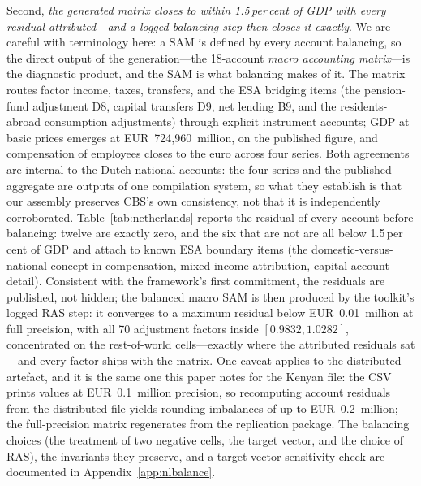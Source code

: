 Second, \emph{the generated matrix closes to within 1.5\,per\,cent of
GDP with every residual attributed---and a logged balancing step then
closes it exactly}. We are careful with terminology here: a SAM is
defined by every account balancing, so the direct output of the
generation---the 18-account \emph{macro accounting matrix}---is the
diagnostic product, and the SAM is what balancing makes of it. The matrix
routes factor income, taxes, transfers, and the ESA bridging items (the
pension-fund adjustment D8, capital transfers D9, net lending B9, and the
residents-abroad consumption adjustments) through explicit instrument
accounts; GDP at basic prices emerges at EUR~724{,}960~million, on the
published figure, and compensation of employees closes to the euro across
four series. Both agreements are internal to the Dutch national accounts:
the four series and the published aggregate are outputs of one compilation
system, so what they establish is that our assembly preserves CBS's own
consistency, not that it is independently corroborated. Table~\ref{tab:netherlands} reports the residual
of every account before balancing: twelve are exactly zero, and the six
that are not are all below 1.5\,per\,cent of GDP and attach to known ESA
boundary items (the domestic-versus-national concept in compensation,
mixed-income attribution, capital-account detail). Consistent with the
framework's first commitment, the residuals are published, not hidden;
the balanced macro SAM is then produced by the toolkit's logged RAS
step: it converges to a maximum residual below EUR~0.01~million at full
precision, with all 70 adjustment factors inside $[0.9832, 1.0282]$,
concentrated on the rest-of-world cells---exactly where the attributed
residuals sat---and every factor ships with the matrix. One caveat
applies to the distributed artefact, and it is the same one this paper
notes for the Kenyan file: the CSV prints values at EUR~0.1~million
precision, so recomputing account residuals from the distributed file
yields rounding imbalances of up to EUR~0.2~million; the full-precision
matrix regenerates from the replication package. The balancing choices (the treatment
of two negative cells, the target vector, and the choice of RAS), the
invariants they preserve, and a target-vector sensitivity check are
documented in Appendix~\ref{app:nlbalance}.

\begin{table}[t]
\centering\small
\caption{Netherlands: account residuals of the generated 2019 macro
accounting matrix, before balancing (no benchmark consulted; GDP at basic
prices EUR 724{,}960m). The logged RAS step closes all residuals with
adjustment factors in $[0.9832, 1.0282]$.}
\label{tab:netherlands}

\end{table}

